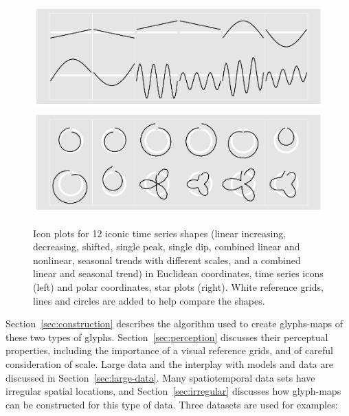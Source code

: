 \documentclass[oneside]{article}
\begin{document}
\begin{figure}[htbp]
  \centering
  \includegraphics[width=0.5\linewidth]{euclid-to-polar-1}%
  \includegraphics[width=0.5\linewidth]{euclid-to-polar-2}

  \caption{Icon plots for 12 iconic time series shapes (linear increasing, decreasing, shifted, single peak, single dip, combined linear and nonlinear, seasonal trends with different scales, and a combined linear and seasonal trend) in Euclidean coordinates, time series icons (left) and polar coordinates, star plots (right). White reference grids, lines and circles are added to help compare the shapes.}
  \label{fig:templates}
\end{figure}



Section~\ref{sec:construction} describes the algorithm used to create glyphs-maps of these two types of glyphs. Section~\ref{sec:perception} discusses their perceptual properties, including the importance of a visual reference grids, and of careful consideration of scale. Large data and the interplay with models and data are discussed in Section~\ref{sec:large-data}. Many spatiotemporal data sets have irregular spatial locations, and Section~\ref{sec:irregular} discusses how glyph-maps can be constructed for this type of data. Three datasets are used for examples:
\end{document}
